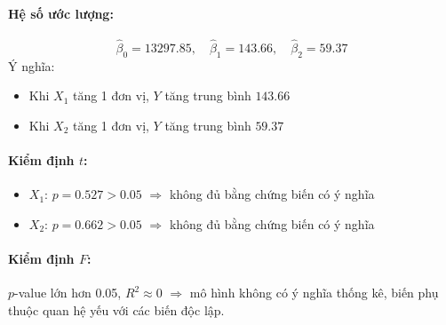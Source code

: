 \paragraph{Hệ số ước lượng:}
\[
\hat{\beta}_0 = 13297.85, \quad \hat{\beta}_1 = 143.66, \quad \hat{\beta}_2 = 59.37
\]
Ý nghĩa:
\begin{itemize}
    \item Khi $X_1$ tăng 1 đơn vị, $Y$ tăng trung bình $143.66$
    \item Khi $X_2$ tăng 1 đơn vị, $Y$ tăng trung bình $59.37$
\end{itemize}

\paragraph{Kiểm định $t$:}
\begin{itemize}
    \item $X_1$: $p = 0.527 > 0.05$ $\Rightarrow$ không đủ bằng chứng biến có ý nghĩa
    \item $X_2$: $p = 0.662 > 0.05$ $\Rightarrow$ không đủ bằng chứng biến có ý nghĩa
\end{itemize}

\paragraph{Kiểm định $F$:}
$p$-value lớn hơn 0.05, $R^2 \approx 0$ $\Rightarrow$ mô hình không có ý nghĩa thống kê, biến phụ thuộc quan hệ yếu với các biến độc lập.

